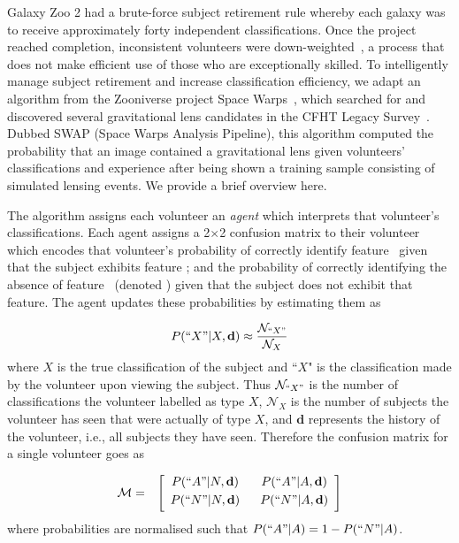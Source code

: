 Galaxy Zoo 2 had a brute-force subject retirement rule whereby each galaxy was to 
receive approximately forty independent classifications.  Once the project reached 
completion, inconsistent volunteers were down-weighted~\citep{Willett2013}, 
a process that does not make efficient use of those who are exceptionally skilled. 
To intelligently manage subject retirement and increase classification efficiency, 
we adapt an algorithm from the Zooniverse  project Space Warps~\citep{Marshall2016}, 
which searched for and discovered several gravitational lens candidates in the 
CFHT Legacy Survey~\citep{More2016}.  Dubbed SWAP (Space Warps Analysis Pipeline), 
 this algorithm computed the probability that an image contained a gravitational lens 
given volunteers' classifications and experience after being shown a training sample 
consisting of simulated lensing events.  We provide a brief overview here.  

The algorithm assigns each volunteer an \textit{agent} which interprets that 
volunteer's classifications. Each agent assigns a 2$\times$2 confusion matrix 
to their volunteer which encodes that volunteer's probability of correctly 
identify feature \A~given that the subject exhibits feature \A; 
and the probability of correctly identifying the absence of feature 
\A~(denoted \N) given that the subject does not exhibit that feature. 
The agent updates these probabilities by estimating them as 

\begin{equation}
P(``X" | X, \mathbf{d}) \approx \frac{\mathcal{N}_{``X"}}{\mathcal{N}_{X}}
\end{equation}
where $X$ is the true classification of the subject and ``$X$" is the classification made by the volunteer upon viewing the subject. Thus $\mathcal{N}_{``X"}$ is the number of classifications the volunteer labelled as type $X$, 
$\mathcal{N}_X$ is the number of subjects the volunteer has seen that were actually of type $X$,
and $\mathbf{d}$ represents the history of the volunteer, i.e., all subjects they have seen.
Therefore the confusion matrix for a single volunteer goes as

\begin{eqnarray}
\mathcal{M} & = & \left[
	\begin{array}{cc}
		P(``A"|N, \mathbf{d}) ~~& P(``A" | A, \mathbf{d}) \\[0.3em]
		P(``N"|N, \mathbf{d})~~& P(``N"|A, \mathbf{d}) \\[0.3em]
	\end{array}\right]
\end{eqnarray}
where probabilities are normalised such that $P(``A"|A) = 1- P(``N" | A) $.

